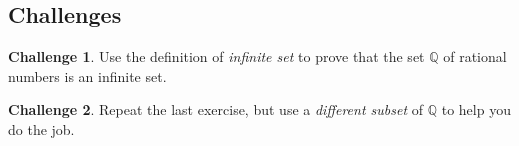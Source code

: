 \documentclass[12pt,letterpaper]{article}
\theoremstyle{definition}
\newtheorem*{challenge}{Challenge}
\begin{document}
\subsection*{Challenges}

\begin{challenge}
Use the definition of \emph{infinite set} to prove that the set $\mathbb{Q}$ of rational numbers is an infinite set.
\end{challenge}

\begin{challenge}
Repeat the last exercise, but use a \emph{different subset} of $\mathbb{Q}$ to help you do the job.
\end{challenge}



\end{document}
